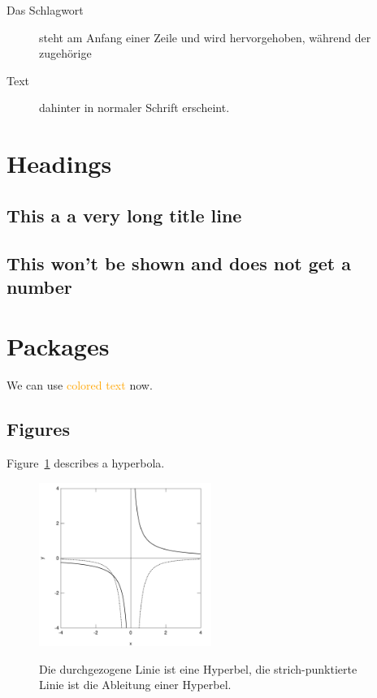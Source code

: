 \documentclass{scrartcl}
\begin{document}
\begin{description}
	\item[Das Schlagwort] steht am Anfang einer Zeile und wird
	hervorgehoben, während der zugehörige
	\item[Text] dahinter in normaler Schrift erscheint.
\end{description}


\section{Headings}


\subsection[Short Title]{This a a very long title line}

\subsection*{This won't be shown and does not get a number}


\section{Packages}


We can use \textcolor{orange}{colored text} now.



\subsection{Figures}

Figure~\ref{fig:AbleitungHyperbel} describes a hyperbola.

\begin{figure}[h]
	\centering
	\includegraphics[width=0.5\textwidth]{HyperbelAbleitung-eps-converted-to.pdf}
	\label{fig:AbleitungHyperbel}
	\caption[Hyperbel und Ableitung.]{Die durchgezogene Linie ist eine Hyperbel, die strich-punktierte  Linie ist die Ableitung einer Hyperbel.}
\end{figure}
\end{document}
